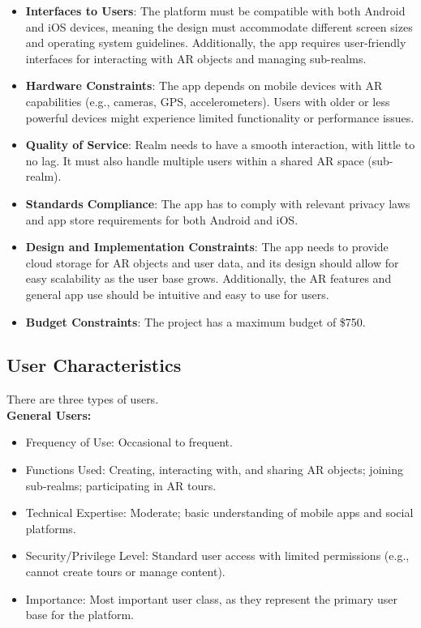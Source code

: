\documentclass{article}
\begin{document}
\begin{itemize}
    \item \textbf{Interfaces to Users}: The platform must be compatible with both Android and iOS devices, meaning the design must accommodate different screen sizes and operating system guidelines. Additionally, the app requires user-friendly interfaces for interacting with AR objects and managing sub-realms.

    \item \textbf{Hardware Constraints}: The app depends on mobile devices with AR capabilities (e.g., cameras, GPS, accelerometers). Users with older or less powerful devices might experience limited functionality or performance issues.

    \item \textbf{Quality of Service}: Realm needs to have a smooth interaction, with little to no lag. It must also handle multiple users within a shared AR space (sub-realm).

    \item \textbf{Standards Compliance}: The app has to comply with relevant privacy laws and app store requirements for both Android and iOS.

    \item \textbf{Design and Implementation Constraints}: The app needs to provide cloud storage for AR objects and user data, and its design should allow for easy scalability as the user base grows. Additionally, the AR features and general app use should be intuitive and easy to use for users.

    \item \textbf{Budget Constraints}: The project has a maximum budget of \$750.
\end{itemize}

\subsection{User Characteristics}

There are three types of users.\\

\textbf{General Users:}
\begin{itemize}
    \item Frequency of Use: Occasional to frequent.
    \item Functions Used: Creating, interacting with, and sharing AR objects; joining sub-realms; participating in AR tours.
    \item Technical Expertise: Moderate; basic understanding of mobile apps and social platforms.
    \item Security/Privilege Level: Standard user access with limited permissions (e.g., cannot create tours or manage content).
    \item Importance: Most important user class, as they represent the primary user base for the platform.
\end{itemize}
\end{document}

